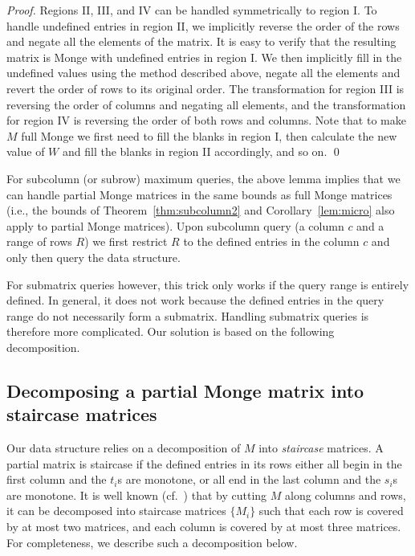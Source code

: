 \documentclass{llncs}
\begin{document}
\begin{proof}
Regions II, III, and IV can be handled symmetrically to region I. To handle undefined entries in region II, we 
implicitly reverse the order of the rows and negate all the elements of the matrix. It is easy to verify that the resulting matrix is Monge with undefined entries in region I. We then implicitly fill in the undefined values using the method described above, negate all the elements and revert the order of rows to its original order. The transformation for region III is reversing the order of columns and negating all elements, and the transformation for region IV is reversing the order of both rows and columns.
Note that to make $M$
full Monge we first need to fill the blanks in region I, then calculate the new value of $W$
and fill the blanks in region II accordingly, and so on.
\qed \end{proof}

For subcolumn (or subrow) maximum queries, the above lemma implies that we can handle partial Monge matrices in the same bounds as full Monge matrices (i.e., the bounds of Theorem~\ref{thm:subcolumn2} and Corollary~\ref{lem:micro} also apply to partial Monge matrices). 
Upon subcolumn query (a column $c$ and a range of rows $R$) we first restrict $R$ to the defined entries in the column  $c$ and only then query the data structure. 

For submatrix queries however, this trick only works if the query range is entirely defined. In general, it does not work because the defined entries in the query range do not necessarily form a submatrix. Handling submatrix queries is therefore more complicated. Our solution is based on the following decomposition. 

\subsection{Decomposing a partial Monge matrix into staircase matrices}  

Our data structure relies on a decomposition of $M$ into {\em staircase}
matrices. A partial matrix is staircase if the defined entries in its rows either all  begin in the first column and the $t_i$s are monotone, or all end in the last column and the $s_i$s are monotone. 
It is well known (cf.~\cite{AggarwalK90}) that by cutting
$M$ along columns and rows, it can be decomposed into staircase
matrices $\{M_i\}$ such that each row is covered by at most two matrices,
and each column is covered by at most three  matrices. 
For completeness, we  describe such a decomposition below.
\end{document}
